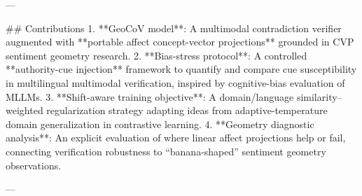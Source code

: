 ---

## Contributions  
1. **GeoCoV model**: A multimodal contradiction verifier augmented with **portable affect concept-vector projections** grounded in CVP sentiment geometry research.  
2. **Bias-stress protocol**: A controlled **authority-cue injection** framework to quantify and compare cue susceptibility in multilingual multimodal verification, inspired by cognitive-bias evaluation of MLLMs.  
3. **Shift-aware training objective**: A domain/language similarity–weighted regularization strategy adapting ideas from adaptive-temperature domain generalization in contrastive learning.  
4. **Geometry diagnostic analysis**: An explicit evaluation of where linear affect projections help or fail, connecting verification robustness to “banana-shaped” sentiment geometry observations.

---